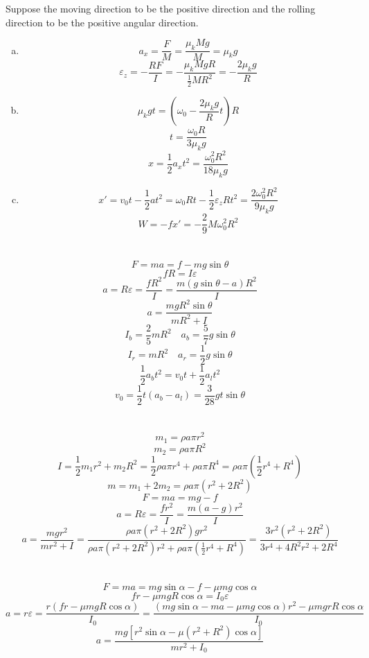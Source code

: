 \documentclass{article}
\begin{document}
\section{}
Suppose the moving direction to be the positive direction and the rolling direction to be the positive angular direction.
\begin{enumerate}[(a)]
\item
\vspace{7cm}
$$a_x=\frac{F}{M}=\frac{\mu_kMg}{M}=\mu_kg$$
$$\varepsilon_z=-\frac{RF}{I}=-\frac{\mu_kMgR}{\frac{1}{2}MR^2}=-\frac{2\mu_kg}{R}$$
\item
$$\mu_kgt=\left(\omega_0-\frac{2\mu_kg}{R}t\right)R$$
$$t=\frac{\omega_0R}{3\mu_kg}$$
$$x=\frac{1}{2}a_xt^2=\frac{\omega_0^2R^2}{18\mu_kg}$$
\item
$$x'=v_0t-\frac{1}{2}at^2=\omega_0Rt-\frac{1}{2}\varepsilon_zRt^2=\frac{2\omega_0^2R^2}{9\mu_kg}$$
$$W=-fx'=-\frac{2}{9}M\omega_0^2R^2$$
\end{enumerate}

\section{}
$$F=ma=f-mg\sin\theta$$
$$fR=I\varepsilon$$
$$a=R\varepsilon=\frac{fR^2}{I}=\frac{m(g\sin\theta-a)R^2}{I}$$
$$a=\frac{mgR^2\sin\theta}{mR^2+I}$$
$$I_b=\frac{2}{5}mR^2\quad a_b=\frac{5}{7}g\sin\theta$$
$$I_r=mR^2\quad a_r=\frac{1}{2}g\sin\theta$$
$$\frac{1}{2}a_bt^2=v_0t+\frac{1}{2}a_lt^2$$
$$v_0=\frac{1}{2}t(a_b-a_l)=\frac{3}{28}gt\sin\theta$$

\section{}
$$m_1=\rho a\pi r^2$$
$$m_2=\rho a\pi R^2$$
$$I=\frac{1}{2}m_1r^2+m_2R^2=\frac{1}{2}\rho a\pi r^4+\rho a\pi R^4=\rho a\pi\left(\frac{1}{2}r^4+R^4\right)$$
$$m=m_1+2m_2=\rho a\pi(r^2+2R^2)$$
$$F=ma=mg-f$$
$$a=R\varepsilon=\frac{fr^2}{I}=\frac{m(a-g)r^2}{I}$$
$$a=\frac{mgr^2}{mr^2+I}=\frac{\rho a\pi(r^2+2R^2)gr^2}{\rho a\pi(r^2+2R^2)r^2+\rho a\pi\left(\frac{1}{2}r^4+R^4\right)}=\frac{3r^2(r^2+2R^2)}{3r^4+4R^2r^2+2R^4}$$

\section{}
$$F=ma=mg\sin\alpha-f-\mu mg\cos\alpha$$
$$fr-\mu mgR\cos\alpha=I_0\varepsilon$$
$$a=r\varepsilon=\frac{r(fr-\mu mgR\cos\alpha)}{I_0}
=\frac{(mg\sin\alpha-ma-\mu mg\cos\alpha)r^2-\mu mgrR\cos\alpha}{I_0}$$
$$a=\frac{mg[r^2\sin\alpha-\mu(r^2+R^2)\cos\alpha]}{mr^2+I_0}$$
\end{document}
